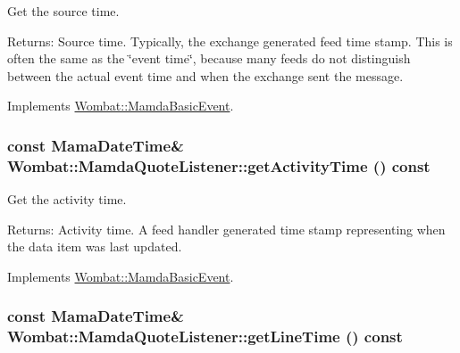Get the source time. 

\begin{Desc}
\item[Returns:]Source time. Typically, the exchange generated feed time stamp. This is often the same as the \char`\"{}event time\char`\"{}, because many feeds do not distinguish between the actual event time and when the exchange sent the message. \end{Desc}


Implements \hyperlink{classWombat_1_1MamdaBasicEvent_60b5d51f3799c4762090505ef5b213e9}{Wombat::Mamda\-Basic\-Event}.\hypertarget{classWombat_1_1MamdaQuoteListener_367521366aaadbe118e70ab32508d7c4}{
\subsubsection[getActivityTime]{\setlength{\rightskip}{0pt plus 5cm}const Mama\-Date\-Time\& Wombat::Mamda\-Quote\-Listener::get\-Activity\-Time () const}}
\label{classWombat_1_1MamdaQuoteListener_367521366aaadbe118e70ab32508d7c4}


Get the activity time. 

\begin{Desc}
\item[Returns:]Activity time. A feed handler generated time stamp representing when the data item was last updated. \end{Desc}


Implements \hyperlink{classWombat_1_1MamdaBasicEvent_b3810afc69474ef3b192ee4c9307e714}{Wombat::Mamda\-Basic\-Event}.\hypertarget{classWombat_1_1MamdaQuoteListener_4aa61f82eb9452a38d2c483a5626b8b1}{
\subsubsection[getLineTime]{\setlength{\rightskip}{0pt plus 5cm}const Mama\-Date\-Time\& Wombat::Mamda\-Quote\-Listener::get\-Line\-Time () const}}
\label{classWombat_1_1MamdaQuoteListener_4aa61f82eb9452a38d2c483a5626b8b1}


